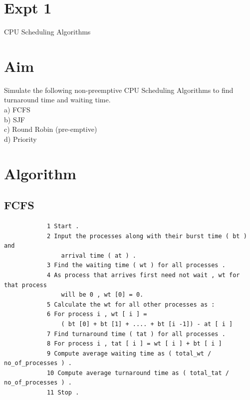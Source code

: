 \documentclass[13pt,oneside]{book}
\begin{document}
\section*{Expt 1}
\begin{center}
    \Large{CPU Scheduling Algorithms}
\end{center}

\section*{Aim}
\large{
Simulate the following non-preemptive CPU Scheduling
Algorithms to find turnaround time and waiting time.\\
a) FCFS\\
b) SJF\\
c) Round Robin (pre-emptive)\\
d) Priority\\
}

\section*{Algorithm}
    \subsection*{FCFS}
	    \begin{verbatim}
	        1 Start .
            2 Input the processes along with their burst time ( bt ) and
                arrival time ( at ) .
            3 Find the waiting time ( wt ) for all processes .
            4 As process that arrives first need not wait , wt for that process
                will be 0 , wt [0] = 0.
            5 Calculate the wt for all other processes as :
            6 For process i , wt [ i ] = 
                ( bt [0] + bt [1] + .... + bt [i -1]) - at [ i ]
            7 Find turnaround time ( tat ) for all processes .
            8 For process i , tat [ i ] = wt [ i ] + bt [ i ]
            9 Compute average waiting time as ( total_wt / no_of_processes ) .
            10 Compute average turnaround time as ( total_tat / no_of_processes ) .
            11 Stop .
	   \end{verbatim}  
\end{document}
